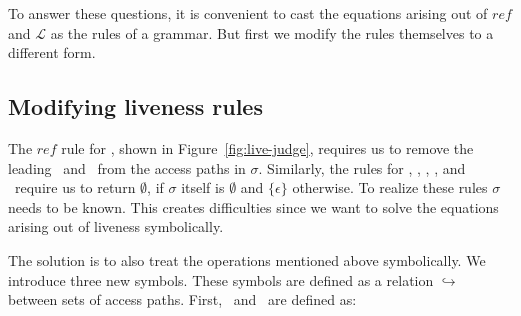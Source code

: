 \documentclass[9pt]{sigplanconf}
\begin{document}
To  answer these  questions, it  is convenient  to cast  the equations
arising out of $\mathit{ref}$  and $\mathcal{L}$ as the rules of a
grammar.   But first  we modify  the rules  themselves to  a different
form.

\subsection{Modifying liveness rules}

The      $\mathit{ref}$     rule      for     \CONS,      shown     in
Figure~\ref{fig:live-judge},  requires   us  to  remove   the  leading
\acar\ and \acdr\  from the access paths in  $\sigma$.  Similarly, the
rules for  \CAR, \CDR, \PRIM, \NULLQ,  and \SIF\ require  us to return
$\emptyset$, if  $\sigma$ itself is $\emptyset$ and
$\lbrace\epsilon\rbrace$ otherwise.  To  realize these rules
$\sigma$ needs to be known. This creates difficulties since we want to
solve the equations arising out of liveness symbolically.

The  solution  is  to   also  treat  the  operations  mentioned  above
symbolically.   We  introduce three  new  symbols.  These symbols  are
defined as a relation  $\hookrightarrow$ between sets of access paths.
First, \bcar\ and \bcdr\ are defined as:
\end{document}
